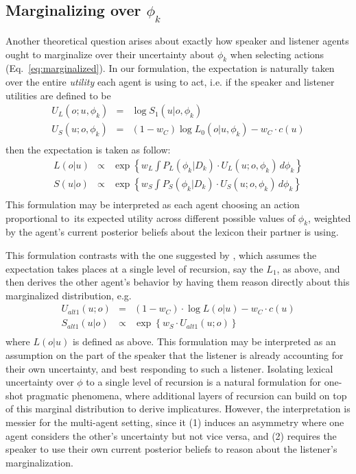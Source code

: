 \documentclass[10pt, jou, floatsintext]{apa7}
\begin{document}
\subsection{Marginalizing over $\phi_k$}
Another theoretical question arises about exactly how speaker and listener agents ought to marginalize over their uncertainty about $\phi_k$ when selecting actions (Eq.~\ref{eq:marginalized}). 
In our formulation, the expectation is naturally taken over the entire \emph{utility} each agent is using to act, i.e. if the speaker and listener utilities are defined to be 
$$
\begin{array}{rcl}
U_L(o;u, \phi_k) & = &  \log S_1(u|o, \phi_k)\\
U_S(u;o, \phi_k) & = &  (1-w_C)\log L_0(o|u, \phi_k) - w_C \cdot c(u) \\
\end{array}
$$
then the expectation is taken as follow:
$$
\begin{array}{rcl}
L(o|u) & \propto & \exp\left\{w_L\int P_L(\phi_k |D_k)\cdot U_L(u; o, \phi_k) \, d \phi_k\right\}\\
S(u|o) & \propto & \exp\left\{w_S\int P_S(\phi_k | D_k) \cdot U_S(u; o, \phi_k) \, d \phi_k\right\} \\
\end{array}
$$
This formulation may be interpreted as each agent choosing an action proportional to its expected utility across different possible values of $\phi_k$, weighted by the agent's current posterior beliefs about the lexicon their partner is using.

This formulation contrasts with the one suggested by , which assumes the expectation takes places at a single level of recursion, say the $L_1$, as above, and then derives the other agent's behavior by having them reason directly about this marginalized distribution, e.g.
$$
\begin{array}{rcl}
U_{alt1}(u;o) & = & (1-w_C) \cdot \log L(o|u) - w_C \cdot c(u)\\
S_{alt1}(u|o) & \propto & \exp\left\{w_S \cdot U_{alt1}(u;o)\right\} \\
\end{array}
$$
where $L(o|u)$ is defined as above.
This formulation may be interpreted as an assumption on the part of the speaker that the listener is already accounting for their own uncertainty, and best responding to such a listener.
Isolating lexical uncertainty over $\phi$ to a single level of recursion is a natural formulation for one-shot pragmatic phenomena, where additional layers of recursion can build on top of this marginal distribution to derive implicatures.
However, the interpretation is messier for the multi-agent setting, since it (1) induces an asymmetry where one agent considers the other's uncertainty but not vice versa, and (2) requires the speaker to use their own current posterior beliefs to reason about the listener's marginalization.
\end{document}
